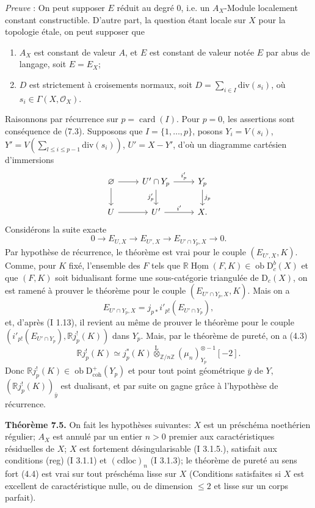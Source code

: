 \documentclass[11pt]{article}
\DeclareMathOperator{\Hom}{Hom}
\newcommand{\R}{\mathbb{R}}\newcommand{\RHomCore}{\mathbb{R}\mathrm{Hom}}
\newcommand{\D}{\mathrm{D}}
\newcommand{\Z}{\mathbb{Z}}
\newcommand{\ob}{\operatorname{ob}}
\providecommand{\Hom}{\operatorname{Hom}}
\providecommand{\ob}{\operatorname{ob}}
\providecommand{\R}{\mathrm R}
\providecommand{\Z}{\mathbb Z}
\providecommand{\Hom}{\operatorname{Hom}}
\begin{document}
\emph{Preuve} : On peut supposer $E$ réduit au degré $0$, i.e. un $A_X$-Module localement constant constructible. D'autre part, la question étant locale sur $X$ pour la topologie étale, on peut supposer que
\begin{enumerate}[label=(\alph*)]
\item $A_X$ est constant de valeur $A$, et $E$ est constant de valeur notée $E$ par abus de langage, soit $E=E_X$;
\item $D$ est strictement à croisements normaux, soit $D=\sum_{i\in I}\mathrm{div}(s_i)$, où $s_i\in\Gamma(X,\mathcal{O}_X)$.
\end{enumerate}
Raisonnons par récurrence sur $p=\operatorname{card}(I)$. Pour $p=0$, les assertions sont conséquence de (7.3). Supposons que $I=\{1,\ldots,p\}$, posons $Y_i=V(s_i)$, $Y'=V(\sum_{l\leq i\leq p-1}\mathrm{div}(s_i))$, $U'=X-Y'$, d'où un diagramme cartésien d'immersions
\[
\begin{tikzcd}
\varnothing \arrow[r] \arrow[d] & U'\cap Y_p \arrow[r,"i'_p"] \arrow[d,"j'_p"'] & Y_p \arrow[d,"j_p"]\\
U \arrow[r] & U' \arrow[r,"i'"] & X.
\end{tikzcd}
\]
Considérons la suite exacte
\[
        0\longrightarrow E_{U,X}\longrightarrow E_{U',X}\longrightarrow E_{U'\cap Y_p,X}\longrightarrow0.
\]
Par hypothèse de
récurrence, le théorème est vrai pour le couple $(E_{U',X},K)$. Comme, pour $K$ fixé, l'ensemble des $F$ tels que $\R\underline{\Hom}(F,K)\in\ob\D_c^b(X)$ et que $(F,K)$ soit bidualisant forme une sous-catégorie triangulée de $\D_c(X)$, on est ramené à prouver le théorème pour le couple $(E_{U'\cap Y_p,X},K)$. Mais on a
\[
        E_{U'\cap Y_p,X}=j_{p*}i'_{p!}(E_{U'\cap Y_p}),
\]
et, d'après (I 1.13), il revient au même de prouver le théorème pour le couple $(i'_{p!}(E_{U'\cap Y_p}),\R j_p^!(K))$ dans $Y_p$. Mais, par le théorème de pureté, on a (4.3)
\[
        \R j_p^!(K)\simeq j_p^*(K)\overset{\mathrm{L}}{\otimes}_{\Z/n\Z}(\mu_n)_{Y_p}^{\otimes -1}[-2].
\]
Donc $\R j_p^!(K)\in\ob\D^{+}_{\mathrm{coh}}(Y_p)$ et pour tout point géométrique $\bar{y}$ de $Y$, $(\R j_p^!(K))_{\bar{y}}$ est dualisant, et par suite on gagne grâce à l'hypothèse de récurrence.

\textbf{Théorème 7.5.} On fait les hypothèses suivantes: $X$ est un préschéma noethérien régulier; $A_X$ est annulé par un entier $n>0$ premier aux caractéristiques résiduelles de $X$; $X$ est fortement désingularisable (I 3.1.5.), satisfait aux conditions (reg) (I 3.1.1) et $(\mathrm{cdloc})_n$ (I 3.1.3); le théorème de pureté au sens fort (4.4) est vrai sur tout préschéma lisse sur $X$ (Conditions satisfaites si $X$ est excellent de caractéristique nulle, ou de dimension $\leq2$ et lisse sur un corps parfait).
\end{document}

